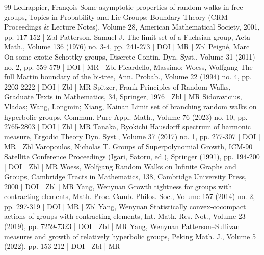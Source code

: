 \begin{thebibliography}{99}
 Ledrappier, François Some asymptotic properties of random walks in free groups, Topics in Probability and Lie Groups: Boundary Theory (CRM Proceedings \& Lecture Notes), Volume 28, American Mathematical Society, 2001, pp. 117-152 | Zbl
 Patterson, Samuel J. The limit set of a Fuchsian group, Acta Math., Volume 136 (1976) no. 3-4, pp. 241-273 | DOI | MR | Zbl
 Peigné, Marc On some exotic Schottky groups, Discrete Contin. Dyn. Syst., Volume 31 (2011) no. 2, pp. 559-579 | DOI | MR | Zbl
 Picardello, Massimo; Woess, Wolfgang The full Martin boundary of the bi-tree, Ann. Probab., Volume 22 (1994) no. 4, pp. 2203-2222 | DOI | Zbl | MR
 Spitzer, Frank Principles of Random Walks, Graduate Texts in Mathematics, 34, Springer, 1976 | Zbl | MR
 Sidoravicius, Vladas; Wang, Longmin; Xiang, Kainan Limit set of branching random walks on hyperbolic groups, Commun. Pure Appl. Math., Volume 76 (2023) no. 10, pp. 2765-2803 | DOI | Zbl | MR
 Tanaka, Ryokichi Hausdorff spectrum of harmonic measure, Ergodic Theory Dyn. Syst., Volume 37 (2017) no. 1, pp. 277-307 | DOI | MR | Zbl
 Varopoulos, Nicholas T. Groups of Superpolynomial Growth, ICM-90 Satellite Conference Proceedings (Igari, Satoru, ed.), Springer (1991), pp. 194-200 | DOI | Zbl | MR
 Woess, Wolfgang Random Walks on Infinite Graphs and Groups, Cambridge Tracts in Mathematics, 138, Cambridge University Press, 2000 | DOI | Zbl | MR
 Yang, Wenyuan Growth tightness for groups with contracting elements, Math. Proc. Camb. Philos. Soc., Volume 157 (2014) no. 2, pp. 297-319 | DOI | MR | Zbl
 Yang, Wenyuan Statistically convex-cocompact actions of groups with contracting elements, Int. Math. Res. Not., Volume 23 (2019), pp. 7259-7323 | DOI | Zbl | MR
 Yang, Wenyuan Patterson–Sullivan measures and growth of relatively hyperbolic groups, Peking Math. J., Volume 5 (2022), pp. 153-212 | DOI | Zbl | MR
\end{thebibliography}

